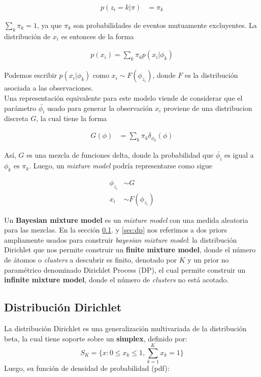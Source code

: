 \documentclass[letterpaper,12pt,oneside]{book} %
\begin{document}
\begin{align}
    p(z_{i}=k|\pi) & = \pi_{k}
\end{align}

$\sum_{k}\pi_{k} = 1$, ya que $\pi_{k}$ son probabilidades de eventos mutuamente excluyentes. La distribución de $x_{i}$ es entonces de la forma

\begin{align}
    p(x_{i}) = \sum_{k}\pi_{k}p(x_{i}|\phi_{k})
\end{align}

Podemos escribir $p(x_{i}|\phi_{k})$ como $x_{i} \sim F(\phi_{z_{i}})$, donde $F$ es la distribución asociada a las observaciones. \\

Una representación equivalente para este modelo viende de considerar que el parámetro $\bar{\phi_{i}}$ usado para generar la observación $x_{i}$ proviene de una distribucion discreta $G$, la cual tiene la forma

\begin{align}
    G(\phi) & = \sum_{k} \pi_{k}\delta_{\phi_{k}}(\phi)
\end{align}

Así, $G$ es una mezcla de funciones delta, donde la probabilidad que $\bar{\phi_{i}}$ es igual a $\phi_{k}$ es $\pi_{k}$. Luego, un \textit{mixture model} podría representarse como sigue

\begin{align}
\phi_{z_{i}} & \sim G\\
x_{i} & \sim  F(\phi_{z_{i}})
\end{align}

Un \textbf{Bayesian mixture model} es un \textit{mixture model} con una medida aleatoria para las mezclas. En la sección \ref{sec:dirichlet}. y \ref{sec:dp} nos referimos a dos priors ampliamente usados para construir \textit{bayesian mixture model}: la distribución Dirichlet que nos permite construir un \textbf{finite mixture model}, donde el número de átomos o \textit{clusters} a descubrir es finito, denotado por $K$ y un prior no paramétrico denominado Dirichlet Process (DP), el cual permite construir un \textbf{infinite mixture model}, donde el número de \textit{clusters} no está acotado. 

\subsection{Distribución Dirichlet}
\label{sec:dirichlet}

La distribución Dirichlet \citep{minka2000estimating} es una generalización multivariada de la distribución beta, la cual tiene soporte sobre un \textbf{simplex}, definido por:
\begin{equation}
    S_{K} = \{x: 0\leq x_{k} \leq 1, \sum_{k=1}^{K}x_{k}=1\}
\end{equation}
Luego, su función de densidad de probabilidad (pdf):
\end{document}
